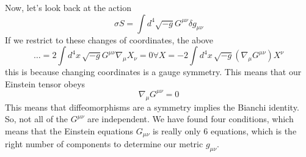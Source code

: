 Now, let's look back at the action
\[
 \sigma S = \int d ^ 4 \sqrt{ -g  }  G ^{ \mu \nu } \delta g _{ \mu \nu }
\] If we restrict to these changes of coordinates, 
the above 
\[
 \dots = 2 \int d ^ 4 x \, \sqrt{ - g }  G ^{ \mu \nu } \nabla _ \mu X _ \nu 
 =0 \forall X  =  -2 \int d ^ 4 x \, \sqrt{ - g }  ( \nabla _ \mu G ^{ \mu \nu } )  X^ \nu 
\]  this is because changing coordinates is a gauge symmetry. 
This means that our Einstein tensor obeys 
\[
 \nabla _ \mu G ^{ \mu \nu }  = 0
\] This means that diffeomorphisms are 
a symmetry implies the Bianchi identity. 
So, not all of the $ G ^{ \mu \nu } $ are independent. 
We have found four conditions, which means that the 
Einstein equations $ G _{ \mu \nu } $ is really only 
6 equations, which is the right number of components 
to determine our metric $ g _{ \mu \nu } $. 


